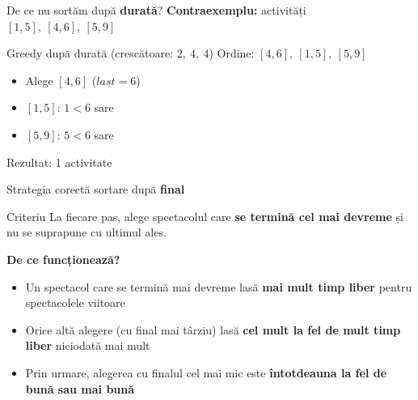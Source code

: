 \documentclass{beamer}
\begin{document}
\begin{frame}{De ce nu sortăm după \textbf{durată}?}
  \textbf{Contraexemplu:} activități $[1,5],\ [4,6],\ [5,9]$
  \smallskip
  \begin{block}{Greedy după durată (crescătoare: $2,\ 4,\ 4$)}
    Ordine: $[4,6],\ [1,5],\ [5,9]$
    \begin{itemize}\itemsep2pt
      \item Alege $[4,6]$ \quad ($\mathit{last}=6$)
      \item $[1,5]$: $1 < 6$ \textemdash{} sare
      \item $[5,9]$: $5 < 6$ \textemdash{} sare
    \end{itemize}
    Rezultat: \alert{1 activitate}
  \end{block}
  \smallskip
  \begin{center}
  \end{center}
\end{frame}

\begin{frame}{Strategia corectă \textemdash{} sortare după \textbf{final}}
  \begin{block}{Criteriu}
    La fiecare pas, alege spectacolul care
    \textbf{se termină cel mai devreme} și nu se suprapune cu ultimul ales.
  \end{block}
  \smallskip
  \textbf{De ce funcționează?}
  \begin{itemize}\itemsep6pt
    \item Un spectacol care se termină mai devreme lasă
          \textbf{mai mult timp liber} pentru spectacolele viitoare
    \item Orice altă alegere (cu final mai târziu) lasă
          \textbf{cel mult la fel de mult timp liber} \textemdash{} niciodată mai mult
    \item Prin urmare, alegerea cu finalul cel mai mic este
          \textbf{întotdeauna la fel de bună sau mai bună}
  \end{itemize}
\end{frame}
\end{document}
